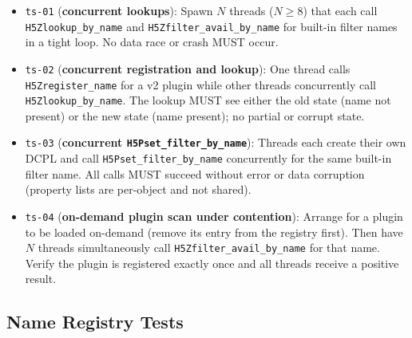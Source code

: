 \documentclass[../HDF5_RFC.tex]{subfiles}
\begin{document}
\begin{itemize}
\item \texttt{ts-01} (\textbf{concurrent lookups}): Spawn $N$ threads
  ($N \geq 8$) that each call \texttt{H5Zlookup\_by\_name} and
  \texttt{H5Zfilter\_avail\_by\_name} for built-in filter names in a tight loop.
  No data race or crash MUST occur.
\item \texttt{ts-02} (\textbf{concurrent registration and lookup}): One thread calls
  \texttt{H5Zregister\_name} for a v2 plugin while other threads concurrently call
  \texttt{H5Zlookup\_by\_name}.  The lookup MUST see either the old state (name not
  present) or the new state (name present); no partial or corrupt state.
\item \texttt{ts-03} (\textbf{concurrent \texttt{H5Pset\_filter\_by\_name}}): Threads each
  create their own DCPL and call \texttt{H5Pset\_filter\_by\_name} concurrently for the
  same built-in filter name.  All calls MUST succeed without error or data
  corruption (property lists are per-object and not shared).
\item \texttt{ts-04} (\textbf{on-demand plugin scan under contention}): Arrange for a
  plugin to be loaded on-demand (remove its entry from the registry first).
  Then have $N$ threads simultaneously call \texttt{H5Zfilter\_avail\_by\_name} for that
  name.  Verify the plugin is registered exactly once and all threads receive a
  positive result.
\end{itemize}


\subsection{Name Registry Tests}
\label{sec:test-registry}
\end{document}
